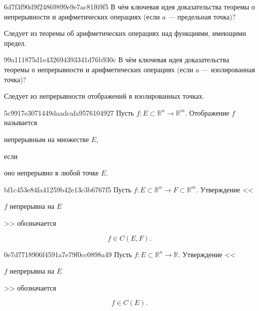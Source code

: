\begin{note}{6d7f3f90d9f24869899e9e7ac81f69f5}
    В чём ключевая идея доказательства теоремы о непрерывности и арифметических операциях (если \({ a }\) --- предельная точка)?

    \begin{cloze}{1}
        Следует из теоремы об арифметических операциях над функциями, имеющими предел.
    \end{cloze}
\end{note}

\begin{note}{99a111875d1e432694393341d76b930c}
    В чём ключевая идея доказательства теоремы о непрерывности и арифметических операциях (если \({ a }\) --- изолированная точка)?

    \begin{cloze}{1}
        Следует из непрерывности отображений в изолированных точках.
    \end{cloze}
\end{note}

\begin{note}{5c9917e3071449daadcafa9576104927}
    Пусть \({ f : E \subset \mathbb R^{n} \to \mathbb R^{m} }\). Отображение \({ f }\) называется \begin{icloze}{2}непрерывным на множестве \({ E }\),\end{icloze} если \begin{icloze}{1}оно непрерывно в любой точке \({ E }\).\end{icloze}
\end{note}

\begin{note}{bf1c453e84fa41259b42e13c3b6767f5}
    Пусть \({ f : E \subset \mathbb R^{n} \to F \subset \mathbb R^{m} }\). Утверждение <<\begin{icloze}{2}\({ f }\) непрерывна на \({ E }\)\end{icloze}>> обозначается
    \begin{icloze}{1}
        \[
            f \in C(E, F).
        \]
    \end{icloze}
\end{note}

\begin{note}{0e7d7718906f4591a7e79f0cc0898a49}
    Пусть \({ f : E \subset \mathbb R^{n} \to \mathbb R }\). Утверждение <<\begin{icloze}{2}\({ f }\) непрерывна на \({ E }\)\end{icloze}>> обозначается
    \begin{icloze}{1}
        \[
            f \in C(E).
        \]
    \end{icloze}
\end{note}

